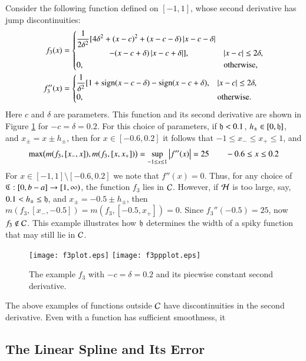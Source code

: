 \documentclass[review]{elsarticle}
\begin{document}
Consider the following function defined on $[-1,1]$, whose second derivative has jump discontinuities:
\begin{align*}
f_3(x) & = \begin{cases} \displaystyle \frac{1}{2\delta^2} [4 \delta^2 + (x-c)^2 + (x-c-\delta)\left \lvert x-c-\delta \right \rvert \\
\qquad \qquad - (x-c+\delta)\left \lvert x-c+\delta \right \rvert], & \left \lvert x-c \right \rvert \le 2\delta, \\
0, & \text{otherwise},
\end{cases} \\
f''_3(x) & = \begin{cases} \displaystyle \frac{1}{\delta^2} [1 + \operatorname{sign}(x-c-\delta) - \operatorname{sign}(x-c+\delta), & \left \lvert x-c \right \rvert \le 2\delta, \\
0, & \text{otherwise}.
\end{cases}
\end{align*}
Here $c$ and $\delta$ are parameters. This function and its second derivative
are shown in Figure \ref{f3fig} for $-c=\delta = 0.2$. For this choice of
parameters, if $\mathfrak{h} < 0.1$, $h_\pm \in [0,\mathfrak{h}]$, and $x_\pm = x\pm h_\pm$, then
for $x \in [-0.6, 0.2]$ it follows that $-1 \le x_- \le x_+ \le 1$, and
\[
\max\bigl(m(f_3,[x_-,x]),m(f_3,[x,x_+])\bigr) = \sup_{-1 \le x \le 1} \left \lvert f''(x) \right \rvert = 25 \qquad -0.6 \le x \le 0.2
\]
For $x \in [-1,1] \setminus [-0.6, 0.2]$ we note that $f''(x) = 0$. Thus, for
any choice of $\mathfrak{C} : [0,b-a] \to [1,\infty)$, the function $f_3$ lies in $\mathcal{C}$.
However, if $\mathcal{H}$ is too large, say, $0.1 < h_\pm \le \mathfrak{h}$, and $x_\pm = -0.5\pm
h_\pm$, then $m(f_3,[x_-,-0.5])=m(f_3,[-0.5,x_+])=0$. Since $f_3''(-0.5) = 25$,
now $f_3 \notin \mathcal{C}$. This example illustrates how $\mathfrak{h}$ determines the width of
a spiky function that may still lie in $\mathcal{C}$.

\begin{figure}[t]
\centering
\texttt{[image: f3plot.eps]} \qquad
\texttt{[image: f3ppplot.eps]} 
\caption{The example $f_3$ with $-c=\delta = 0.2$  and its piecwise constant second derivative.  \label{f3fig}}
\end{figure}

The above examples of functions outside $\mathcal{C}$ have discontinuities in the second
derivative. Even with a function has sufficient smoothness, it

\subsection{The Linear Spline and Its Error}
\end{document}
